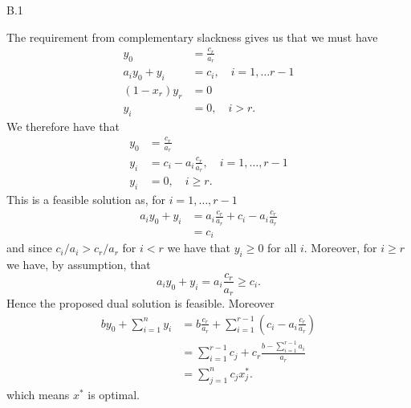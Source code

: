 \documentclass[a4paper]{article}
\begin{document}
\begin{exercise}{B.1}
\begin{enumerate}[label=(\roman*)]
        The requirement from complementary slackness gives us that we must have
        \begin{align*}
          y_0 &= \frac{c_r}{a_r} \\
          a_iy_0 + y_i &= c_i,\quad i = 1,\ldots r-1 \\
          (1 - x_r)y_r &= 0 \\
          y_i &= 0,\quad i > r.
        \end{align*}
        We therefore have that
        \begin{align*}
          y_0 &= \frac{c_r}{a_r} \\
          y_i &= c_i - a_i \frac{c_r}{a_r},\quad i =1, \ldots, r-1 \\
          y_i &= 0, \quad i \geq r.
        \end{align*}
        This is a feasible solution as, for $ i=1, \ldots, r-1 $
        \begin{align*}
          a_iy_0 + y_i &= a_i \frac{c_r}{a_r} + c_i - a_i \frac{c_r}{a_r} \\
                       &= c_i
        \end{align*}
        and since $ c_i/a_i > c_r /a_r $ for $ i < r $ we have that $ y_i \geq 0 $ for all $ i $. Moreover, for $ i \geq r $ we have, by assumption, that
        \begin{equation*}
          a_i y_0 + y_i = a_i \frac{c_r}{a_r} \geq c_i
        .\end{equation*}
        Hence the proposed dual solution is feasible. Moreover
        \begin{align*}
          by_0 + \sum_{i = 1}^{n} y_i &= b \frac{c_r}{a_r} + \sum_{i = 1}^{r - 1} \left( c_i - a_i \frac{c_r}{a_r} \right) \\
                                      &=\sum_{i = 1}^{r - 1} c_j + c_r\frac{b - \sum_{i = 1}^{r - 1} a_i}{a_r} \\
                                      &= \sum_{j = 1}^{n} c_jx^{*}_j
        .\end{align*}
        which means $ x^{*} $ is optimal.


\end{enumerate}
\end{exercise}
\end{document}
